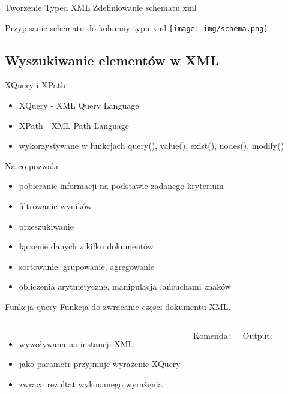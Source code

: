 	\begin{frame}{Tworzenie Typed XML}
		Zdefiniowanie schematu xml		
		
		Przypisanie schematu do kolumny typu xml
		\texttt{[image: img/schema.png]}
		
	\end{frame}

\subsection{Wyszukiwanie elementów w XML}
	\begin{frame}{XQuery i XPath}
		\begin{itemize}
		  \item XQuery - XML Query Language
		  \item XPath - XML Path Language
		  \item wykorzystywane w funkcjach query(), value(), exist(), nodes(),
		  modify()
		\end{itemize}
		Na co pozwala
		\begin{itemize}
		  \item pobieranie informacji na podstawie zadanego kryterium
		  \item filtrowanie wyników
		  \item przeszukiwanie
		  \item łączenie danych z kilku dokumentów
		  \item sortowanie, grupowanie, agregowanie
		  \item obliczenia arytmetyczne, manipulacja łańcuchami znaków
		\end{itemize}
	\end{frame}
	
	\begin{frame}{Funkcja query}	
		Funkcja do zwracanie częsci dokumentu XML.
		\begin{columns}[t]		
		    	\begin{itemize}
				  \item wywoływana na instancji XML
				  \item jako parametr przyjmuje wyrażenie XQuery 
				  \item zwraca rezultat wykonanego wyrażenia
				\end{itemize}
		    	Komenda:
				
				Output:	
							
	    \end{columns}
	\end{frame}
	
